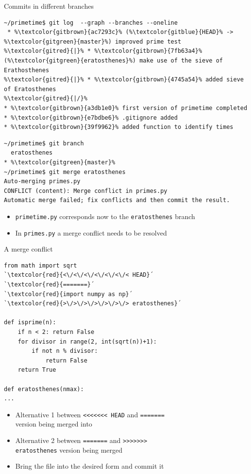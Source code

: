 \documentclass[svgnames]{beamer}
\begin{document}
\begin{frame}[fragile]{Commits in different branches}
 \addtolength\linewidth{0.5truecm}
 \begin{lstlisting}[escapechar=\%]
~/primetime$ git log  --graph --branches --oneline
 * %\textcolor{gitbrown}{ac7293c}% (%\textcolor{gitblue}{HEAD}% -> %\textcolor{gitgreen}{master}%) improved prime test
%\textcolor{gitred}{|}% * %\textcolor{gitbrown}{7fb63a4}% (%\textcolor{gitgreen}{eratosthenes}%) make use of the sieve of Erathosthenes
%\textcolor{gitred}{|}% * %\textcolor{gitbrown}{4745a54}% added sieve of Eratosthenes
%\textcolor{gitred}{|/}%
* %\textcolor{gitbrown}{a3db1e0}% first version of primetime completed
* %\textcolor{gitbrown}{e7bdbe6}% .gitignore added
* %\textcolor{gitbrown}{39f9962}% added function to identify times
 \end{lstlisting}

 \vspace{0.2truecm}
 \begin{lstlisting}[escapechar=\%]
~/primetime$ git branch
  eratosthenes
* %\textcolor{gitgreen}{master}%
~/primetime$ git merge eratosthenes
Auto-merging primes.py
CONFLICT (content): Merge conflict in primes.py
Automatic merge failed; fix conflicts and then commit the result.
 \end{lstlisting}
 \begin{itemize}
  \item \texttt{primetime.py} corresponds now to the \texttt{eratosthenes} branch
  \item In \texttt{primes.py} a merge conflict needs to be resolved
 \end{itemize}
\end{frame}

\begin{frame}[fragile]{A merge conflict}
 \begin{lstlisting}[escapeinside=`´]
from math import sqrt
`\textcolor{red}{<\/<\/<\/<\/<\/<\/< HEAD}´
`\textcolor{red}{=======}´
`\textcolor{red}{import numpy as np}´
`\textcolor{red}{>\/>\/>\/>\/>\/>\/> eratosthenes}´

def isprime(n):
    if n < 2: return False
    for divisor in range(2, int(sqrt(n))+1):
        if not n % divisor:
            return False
    return True

def eratosthenes(nmax):
...
 \end{lstlisting}
 \begin{itemize}
  \item Alternative 1 between \texttt{<\/<\/<\/<\/<\/<\/< HEAD} and \texttt{=======}\\
	version being merged into

  \item Alternative 2 between \texttt{=======} and \texttt{>\/>\/>\/>\/>\/>\/>}\\
	\texttt{eratosthenes} version being merged
  \item Bring the file into the desired form and commit it
 \end{itemize}
\end{frame}
\end{document}
